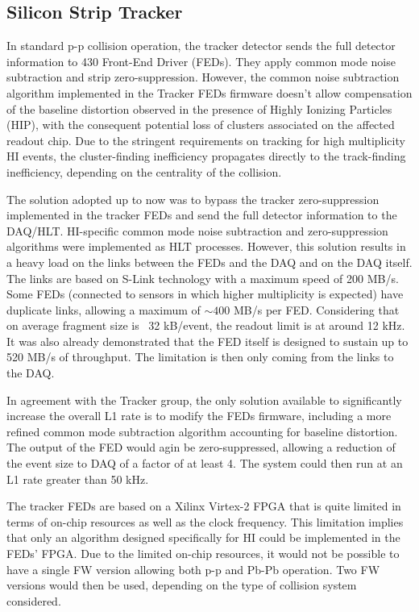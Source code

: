 \subsection{Silicon Strip Tracker\label{subsec:SiTracker}}
In standard p-p collision operation, the tracker detector sends the full detector information to 430 Front-End Driver (FEDs). They apply common mode noise subtraction and strip zero-suppression. However, the common noise subtraction algorithm implemented in the Tracker FEDs firmware doesn't allow compensation of the baseline distortion observed in the presence of Highly Ionizing Particles (HIP), with the consequent potential loss of clusters associated on the affected readout chip. Due to the stringent requirements on tracking for high multiplicity HI events, the cluster-finding inefficiency propagates directly to the track-finding inefficiency, depending on the centrality of the collision.  

The solution adopted up to now was to bypass the tracker zero-suppression implemented in the tracker FEDs and send the full detector information to the DAQ/HLT. HI-specific common mode noise subtraction and zero-suppression algorithms were implemented as HLT processes. However, this solution results in a heavy load on the links between the FEDs and the DAQ and on the DAQ itself. The links are based on S-Link technology with a maximum speed of 200 MB/s. Some FEDs (connected to sensors in which higher multiplicity is expected) have duplicate links, allowing a maximum of $\sim 400$ MB/s per FED.  Considering that on average fragment size is ~32 kB/event, the readout limit is at around 12 kHz. It was also already demonstrated that the FED itself is designed to sustain up to 520 MB/s of throughput. The limitation is then only coming from the links to the DAQ. 

In agreement with the Tracker group, the only solution available to significantly increase the overall L1 rate is to modify the FEDs firmware, including a more refined common mode subtraction algorithm accounting for baseline distortion. The output of the FED would agin be zero-suppressed, allowing a reduction of the event size to DAQ of a factor of at least 4. The system could then run at an L1 rate greater than 50 kHz. 

The tracker FEDs are based on a Xilinx Virtex-2 FPGA that is quite limited in terms of on-chip resources as well as the clock frequency. This limitation implies that only an algorithm designed specifically for HI could be implemented in the FEDs' FPGA. Due to the limited on-chip resources, it would not be possible to have a single FW version allowing both p-p and Pb-Pb operation. Two FW versions would then be used, depending on the type of collision system considered. 

